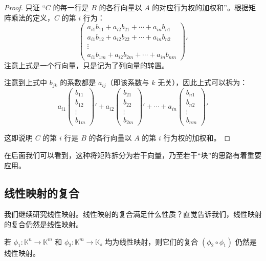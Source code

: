 \begin{proof}
	只证 “$C$ 的每一行是 $B$ 的各行向量以 $A$ 的对应行为权的加权和”。根据矩阵乘法的定义，$C$ 的第 $i$ 行为：
	$$
	\begin{pmatrix}
		a_{i1} b_{11} + a_{i2} b_{21} + \cdots + a_{in} b_{n1}
		\\
		a_{i1} b_{12} + a_{i2} b_{22} + \cdots + a_{in} b_{n2}
		\\
		\vdots
		\\
		a_{i1} b_{1m} + a_{i2} b_{2m} + \cdots + a_{in} b_{nm}
	\end{pmatrix}'
	$$
	注意上式是一个行向量，只是记为了列向量的转置。

	注意到上式中 $b_{jk}$ 的系数都是 $a_{ij}$（即该系数与 $k$ 无关），因此上式可以拆为：
	$$
	a_{i1}
	\begin{pmatrix}
		b_{11} \\ b_{12} \\ \vdots \\ b_{1m}
	\end{pmatrix}'
	+
	a_{i2}
	\begin{pmatrix}
		b_{21} \\ b_{22} \\ \vdots \\ b_{2m}
	\end{pmatrix}'
	+
	\cdots
	+
	a_{in}
	\begin{pmatrix}
		b_{n1} \\ b_{n2} \\ \vdots \\ b_{nm}
	\end{pmatrix}'
	$$

	这即说明 $C$ 的第 $i$ 行是 $B$ 的各行向量以 $A$ 的第 $i$ 行为权的加权和。
\end{proof}

在后面我们可以看到，这种将矩阵拆分为若干向量，乃至若干“块”的思路有着重要应用。

\subsection{线性映射的复合}

我们继续研究线性映射。线性映射的复合满足什么性质？直觉告诉我们，线性映射的复合仍然是线性映射。

\begin{theorem}
	若 $\phi_1 \colon \mathbb K^n \to \mathbb K^m$ 和 $\phi_2 \colon \mathbb K^m \to \mathbb K_s$ 均为线性映射，则它们的复合 $(\phi_2 \circ \phi_1)$ 仍然是线性映射。
\end{theorem}

